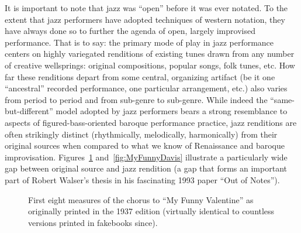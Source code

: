     It is important to note that jazz was ``open'' before it was ever notated. To the extent that jazz performers have adopted techniques of western notation, they have always done so to further the agenda of open, largely improvised performance. That is to say: the primary mode of play in jazz performance centers on highly variegated renditions of existing tunes drawn from any number of creative wellsprings: original compositions, popular songs, folk tunes, etc. How far these renditions depart from some central, organizing artifact (be it one ``ancestral'' recorded performance, one particular arrangement, etc.) also varies from period to period and from sub-genre to sub-genre. While indeed the ``same-but-different'' model adopted by jazz performers bears a strong resemblance to aspects of figured-bass-oriented baroque performance practice, jazz renditions are often strikingly distinct (rhythmically, melodically, harmonically) from their original sources when compared to what we know of Renaissance and baroque improvisation. Figures~\ref{fig:MyFunnyOrig} and~\ref{fig:MyFunnyDavis} illustrate a particularly wide gap between original source and jazz rendition (a gap that forms an important part of Robert Walser's thesis in his fascinating 1993 paper ``Out of Notes'').

        \begin{figure}
            \centering
            \captionsetup{width=.5\textwidth}
            \caption[First eight measures of the chorus to ``My Funny Valentine'' as originally printed in the 1937 edition (virtually identical to countless versions printed in fakebooks since).]{First eight measures of the chorus to ``My Funny Valentine'' as originally printed in the 1937 edition (virtually identical to countless versions printed in fakebooks since).}
            \label{fig:MyFunnyOrig}
        \end{figure}

